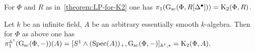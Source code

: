 \documentclass[oneside, 11pt]{amsart} \pdfoutput=1
\begin{document}
\begin{theorem} \label{theorem:pi1-GRDelta}
 For $\Phi$ and $R$ as in~\cref{theorem:LP-for-K2} one has $\pi_1(\mathrm{G}_\mathrm{sc}(\Phi, R[\Delta^\bullet])) = {\mathrm{K}}_2(\Phi, R)$.
\end{theorem}

\begin{corollary} Let $k$ be an infinite field, $A$ be an arbitrary essentially smooth $k$-algebra. Then for $\Phi$ as above one has $\pi_1^{\mathbb{A}^1}(\mathrm{G}_\mathrm{sc}(\Phi, -))(A) = [S^1 \wedge (\mathrm{Spec}(A))_+, \mathrm{G}_\mathrm{sc}(\Phi, -)]_{ \mathbb{A}^1,*} = {\mathrm{K}}_2(\Phi, A).$
\end{corollary}



\printbibliography
\end{document}
